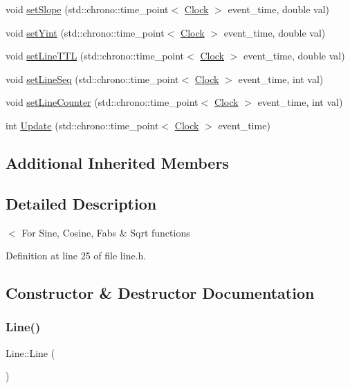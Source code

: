 \begin{DoxyCompactItemize}
void \hyperlink{class_line_a3fb9e9eab13d146feff0bc891709eaf9}{set\+Slope} (std\+::chrono\+::time\+\_\+point$<$ \hyperlink{universe_8h_a0ef8d951d1ca5ab3cfaf7ab4c7a6fd80}{Clock} $>$ event\+\_\+time, double val)
\item 
void \hyperlink{class_line_ad966eb3f1bd4cb29976b3e97811c344f}{set\+Yint} (std\+::chrono\+::time\+\_\+point$<$ \hyperlink{universe_8h_a0ef8d951d1ca5ab3cfaf7ab4c7a6fd80}{Clock} $>$ event\+\_\+time, double val)
\item 
void \hyperlink{class_line_a602398c8c3131ec7236ccadbab8281d5}{set\+Line\+T\+TL} (std\+::chrono\+::time\+\_\+point$<$ \hyperlink{universe_8h_a0ef8d951d1ca5ab3cfaf7ab4c7a6fd80}{Clock} $>$ event\+\_\+time, double val)
\item 
void \hyperlink{class_line_a7c315c5ffdd4fa875918583738e2e157}{set\+Line\+Seq} (std\+::chrono\+::time\+\_\+point$<$ \hyperlink{universe_8h_a0ef8d951d1ca5ab3cfaf7ab4c7a6fd80}{Clock} $>$ event\+\_\+time, int val)
\item 
void \hyperlink{class_line_ab98abcf3c8546e266ae5bbea243d8b8d}{set\+Line\+Counter} (std\+::chrono\+::time\+\_\+point$<$ \hyperlink{universe_8h_a0ef8d951d1ca5ab3cfaf7ab4c7a6fd80}{Clock} $>$ event\+\_\+time, int val)
\item 
int \hyperlink{class_line_a8c6dece66f5cd93ce40134002a40f505}{Update} (std\+::chrono\+::time\+\_\+point$<$ \hyperlink{universe_8h_a0ef8d951d1ca5ab3cfaf7ab4c7a6fd80}{Clock} $>$ event\+\_\+time)
\end{DoxyCompactItemize}
\subsection*{Additional Inherited Members}


\subsection{Detailed Description}
$<$ For Sine, Cosine, Fabs \& Sqrt functions 

Definition at line 25 of file line.\+h.



\subsection{Constructor \& Destructor Documentation}
\mbox{\label{class_line_acc11b8a429d8cdd63ba6803dff5602b3}} 
\subsubsection{\texorpdfstring{Line()}{Line()}\hspace{0.1cm}{\footnotesize\ttfamily [1/4]}}
{\footnotesize\ttfamily Line\+::\+Line (\begin{DoxyParamCaption}{ }\end{DoxyParamCaption})\hspace{0.3cm}{\ttfamily [inline]}}



